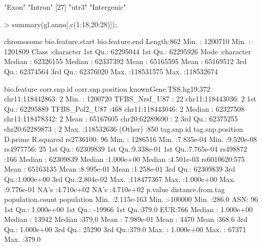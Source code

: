\documentclass[a4paper]{article}
\begin{document}
\begin{Schunk}
\begin{Soutput}
[25] "Exon"                              "Intron"                           
[27] "utr3"                              "Intergenic"                       
\end{Soutput}
\begin{Sinput}
> summary(gl.anno[,c(1:18,20:28)]);
\end{Sinput}
\begin{Soutput}
  chromosome        bio.feature.start   bio.feature.end    
 Length:862         Min.   :  1200710   Min.   :  1201809  
 Class :character   1st Qu.: 62295044   1st Qu.: 62295926  
 Mode  :character   Median : 62326155   Median : 62337392  
                    Mean   : 65165595   Mean   : 65169512  
                    3rd Qu.: 62374564   3rd Qu.: 62376020  
                    Max.   :118531575   Max.   :118532674  
                                                           
             bio.feature           corr.snp.id  corr.snp.position  
 knownGene.TSS.hg19:372   chr11:118442863:  2   Min.   :  1200720  
 TFBS_Nrsf_U87     : 22   chr11:118443036:  2   1st Qu.: 62295889  
 TFBS_Pol2_U87     :468   chr11:118443046:  2   Median : 62327508  
                          chr11:118478342:  2   Mean   : 65167605  
                          chr20:62289690 :  2   3rd Qu.: 62375255  
                          chr20:62289873 :  2   Max.   :118532636  
                          (Other)        :850                      
     tag.snp.id  tag.snp.position       D.prime            R.squared        
 rs2736100: 96   Min.   :  1286516   Min.   :7.835e-04   Min.   :9.520e-08  
 rs4977756: 25   1st Qu.: 62309839   1st Qu.:9.338e-01   1st Qu.:7.765e-04  
 rs498872 :166   Median : 62309839   Median :1.000e+00   Median :4.501e-03  
 rs6010620:575   Mean   : 65163135   Mean   :8.995e-01   Mean   :1.258e-01  
                 3rd Qu.: 62309839   3rd Qu.:1.000e+00   3rd Qu.:2.804e-02  
                 Max.   :118477367   Max.   :1.000e+00   Max.   :9.776e-01  
                                     NA's   :4.710e+02   NA's   :4.710e+02  
    p.value           distance.from.tag population.count population
 Min.   :2.115e-163   Min.   :-100000   Min.   :286.0    ASN: 96   
 1st Qu.: 1.000e+00   1st Qu.: -19966   1st Qu.:379.0    EUR:766   
 Median : 1.000e+00   Median :  13942   Median :379.0              
 Mean   : 7.989e-01   Mean   :   4470   Mean   :368.6              
 3rd Qu.: 1.000e+00   3rd Qu.:  25290   3rd Qu.:379.0              
 Max.   : 1.000e+00   Max.   :  67371   Max.   :379.0              
                                                                   

\end{Soutput}
\end{Schunk}
\end{document}
